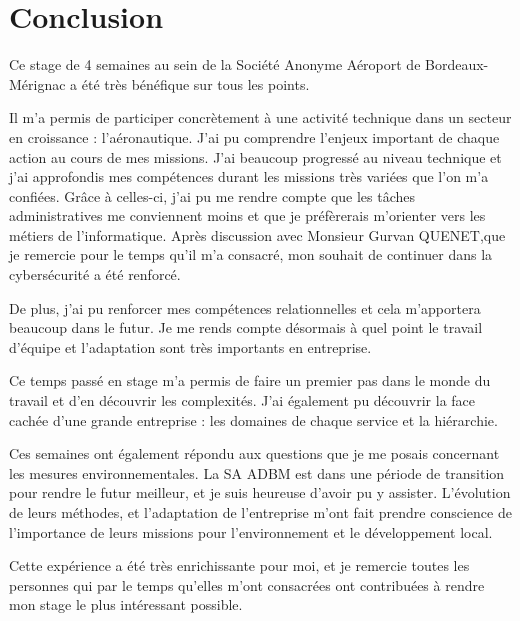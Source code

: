 \chapter{Conclusion}

Ce stage de 4 semaines au sein de la Société Anonyme Aéroport de Bordeaux-Mérignac a été très bénéfique sur tous les points.\newline

Il m'a permis de participer concrètement à une activité technique dans un secteur en croissance : l'aéronautique. J'ai pu comprendre l'enjeux important de chaque action au cours de mes missions. J'ai beaucoup progressé au niveau technique et j'ai approfondis mes compétences durant les missions très variées que l'on m'a confiées. Grâce à celles-ci, j'ai pu me rendre compte que les tâches administratives me conviennent moins et que je préfèrerais m'orienter vers les métiers de l'informatique. Après discussion avec Monsieur Gurvan QUENET,que je remercie pour le temps qu'il m'a consacré, mon souhait de continuer dans la cybersécurité a été renforcé.

De plus, j'ai pu renforcer mes compétences relationnelles et cela m'apportera beaucoup dans le futur. Je me rends compte désormais à quel point le travail d'équipe et l'adaptation sont très importants en entreprise.

Ce temps passé en stage m’a permis de faire un premier pas dans le monde du travail et d’en découvrir les complexités. J’ai également pu découvrir la face cachée d’une grande entreprise : les domaines de chaque service et la hiérarchie.

Ces semaines ont également répondu aux questions que je me posais concernant les mesures environnementales. La SA ADBM est dans une période de transition pour rendre le futur meilleur, et je suis heureuse d'avoir pu y assister. L'évolution de leurs méthodes, et l'adaptation de l'entreprise m'ont fait prendre conscience de l'importance de leurs missions pour l'environnement et le développement local.\newline

Cette expérience a été très enrichissante pour moi, et je remercie toutes les personnes qui par le temps qu'elles m'ont consacrées ont contribuées à rendre mon stage le plus intéressant possible.
